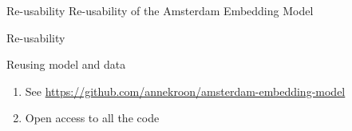 \documentclass[compress]{beamer}
\begin{document}
\begin{frame}{}
\end{frame}




\begin{frame}{Re-usability}
	Re-usability of the Amsterdam Embedding Model
\end{frame}

\begin{frame}{Re-usability}
	\begin{block}{Reusing model and data}
		\begin{enumerate}
			\item See \url{https://github.com/annekroon/amsterdam-embedding-model}
			\item Open access to all the code
		\end{enumerate}
	\end{block}
\end{frame}
\end{document}
